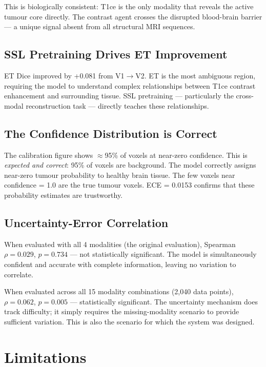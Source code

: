 \documentclass[12pt,a4paper]{article}
\begin{document}
This is biologically consistent: T1ce is the only modality that reveals the active tumour core directly. The contrast agent crosses the disrupted blood-brain barrier --- a unique signal absent from all structural MRI sequences.

\subsection{SSL Pretraining Drives ET Improvement}

ET Dice improved by +0.081 from V1$\rightarrow$V2. ET is the most ambiguous region, requiring the model to understand complex relationships between T1ce contrast enhancement and surrounding tissue. SSL pretraining --- particularly the cross-modal reconstruction task --- directly teaches these relationships.

\subsection{The Confidence Distribution is Correct}

The calibration figure shows $\approx$95\% of voxels at near-zero confidence. This is \emph{expected and correct}: 95\% of voxels are background. The model correctly assigns near-zero tumour probability to healthy brain tissue. The few voxels near confidence = 1.0 are the true tumour voxels. ECE = 0.0153 confirms that these probability estimates are trustworthy.

\subsection{Uncertainty-Error Correlation}

When evaluated with all 4 modalities (the original evaluation), Spearman $\rho = 0.029$, $p = 0.734$ --- not statistically significant. The model is simultaneously confident and accurate with complete information, leaving no variation to correlate.

When evaluated across all 15 modality combinations (2,040 data points), $\rho = 0.062$, $p = 0.005$ --- statistically significant. The uncertainty mechanism does track difficulty; it simply requires the missing-modality scenario to provide sufficient variation. This is also the scenario for which the system was designed.

\section{Limitations}
\end{document}
